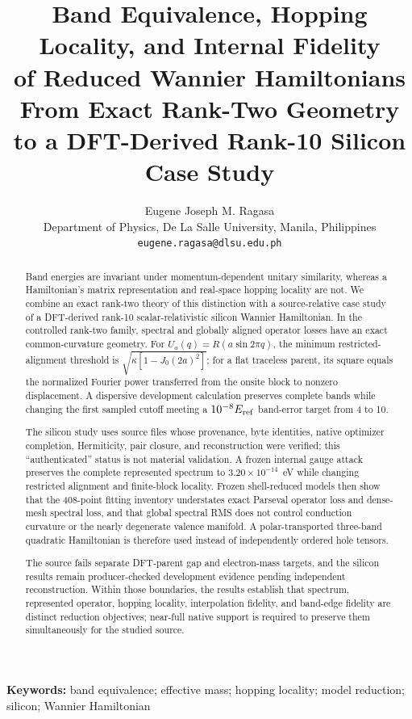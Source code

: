 \documentclass[11pt]{article}
\title{\textbf{Band Equivalence, Hopping Locality, and Internal Fidelity\\
of Reduced Wannier Hamiltonians}\\[1mm]
\large From Exact Rank-Two Geometry to a DFT-Derived Rank-10 Silicon Case Study}
\author{Eugene Joseph M. Ragasa\\
Department of Physics, De La Salle University, Manila, Philippines\\
\texttt{eugene.ragasa@dlsu.edu.ph}}
\date{}
\theoremstyle{definition}
\begin{document}
\maketitle

\begin{abstract}
Band energies are invariant under momentum-dependent unitary similarity, whereas a
Hamiltonian's matrix representation and real-space hopping locality are not.  We combine
an exact rank-two theory of this distinction with a source-relative case study of a
DFT-derived rank-10 scalar-relativistic silicon Wannier Hamiltonian.  In the controlled
rank-two family, spectral and globally aligned operator losses have an exact
common-curvature geometry.  For
$U_a(q)=R(a\sin2\pi q)$, the minimum restricted-alignment threshold is
$\sqrt{\kappa[1-J_0(2a)^2]}$; for a flat traceless parent, its square equals the
normalized Fourier power transferred from the onsite block to nonzero displacement.
A dispersive development calculation preserves complete bands while changing the first
sampled cutoff meeting a $10^{-8}E_{\rm ref}$ band-error target from 4 to 10.

The silicon study uses source files whose provenance, byte identities, native optimizer
completion, Hermiticity, pair closure, and reconstruction were verified; this
``authenticated'' status is not material validation.  A frozen internal gauge attack
preserves the complete represented spectrum to $3.20\times10^{-14}$~eV while changing
restricted alignment and finite-block locality.  Frozen shell-reduced models then show
that the 408-point fitting inventory understates exact Parseval operator loss and
dense-mesh spectral loss, and that global spectral RMS does not control conduction
curvature or the nearly degenerate valence manifold.  A polar-transported three-band
quadratic Hamiltonian is therefore used instead of independently ordered hole tensors.

The source fails separate DFT-parent gap and electron-mass targets, and the silicon
results remain producer-checked development evidence pending independent reconstruction.
Within those boundaries, the results establish that spectrum, represented operator,
hopping locality, interpolation fidelity, and band-edge fidelity are distinct reduction
objectives; near-full native support is required to preserve them simultaneously for the
studied source.
\end{abstract}

\noindent\textbf{Keywords:} band equivalence; effective mass; hopping locality;
model reduction; silicon; Wannier Hamiltonian
\end{document}
